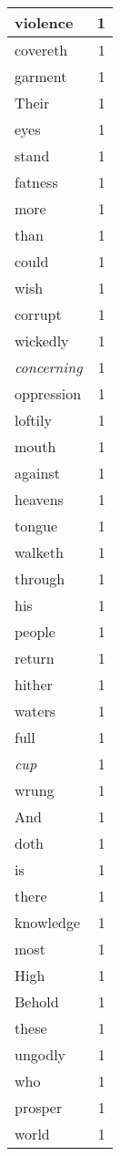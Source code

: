 \begin{center}
\begin{longtable}{l|r}
violence & 1 \\ \hline
covereth & 1 \\ \hline
garment & 1 \\ \hline
Their & 1 \\ \hline
eyes & 1 \\ \hline
stand & 1 \\ \hline
fatness & 1 \\ \hline
more & 1 \\ \hline
than & 1 \\ \hline
could & 1 \\ \hline
wish & 1 \\ \hline
corrupt & 1 \\ \hline
wickedly & 1 \\ \hline
\emph{concerning} & 1 \\ \hline
oppression & 1 \\ \hline
loftily & 1 \\ \hline
mouth & 1 \\ \hline
against & 1 \\ \hline
heavens & 1 \\ \hline
tongue & 1 \\ \hline
walketh & 1 \\ \hline
through & 1 \\ \hline
his & 1 \\ \hline
people & 1 \\ \hline
return & 1 \\ \hline
hither & 1 \\ \hline
waters & 1 \\ \hline
full & 1 \\ \hline
\emph{cup} & 1 \\ \hline
wrung & 1 \\ \hline
And & 1 \\ \hline
doth & 1 \\ \hline
is & 1 \\ \hline
there & 1 \\ \hline
knowledge & 1 \\ \hline
most & 1 \\ \hline
High & 1 \\ \hline
Behold & 1 \\ \hline
these & 1 \\ \hline
ungodly & 1 \\ \hline
who & 1 \\ \hline
prosper & 1 \\ \hline
world & 1 \\ \hline

\end{longtable}
\end{center}
